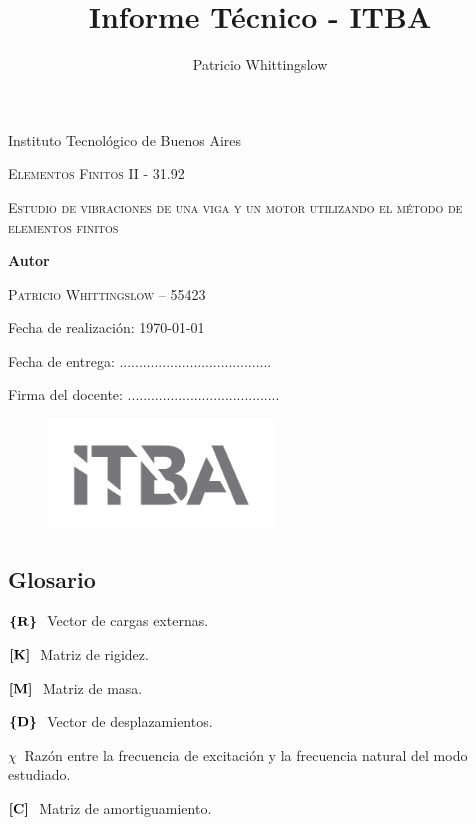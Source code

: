 \documentclass[onecolumn,10pt,titlepage,a4paper]{article}
\title{Informe Técnico - ITBA}
\author{Patricio Whittingslow}
\newcommand{\glossentry}[2]{$#1\ $ \indent #2 \par \vspace{.4cm} }
\begin{document}
\begin{titlepage}
	\centering
	
	{ \large Instituto Tecnológico de Buenos Aires  \par }
	\vspace{2cm}
	{\Large \scshape Elementos Finitos II - 31.92 \par}
	\vspace{2cm}
	{\Huge \scshape Estudio de vibraciones de una viga y un motor utilizando el método de elementos finitos\par }
	\vspace{.5cm}
	{\Large  \par}
	\vspace{2cm}
	{\large \bf Autor \par}
	\vspace{.5cm}
	\textsc{\large Patricio Whittingslow -- 55423}
	\vspace{2cm}
	{\par \large Fecha de realización: \today \par}
	\vspace{1cm}
	{\large Fecha de entrega: .......................................\par}
	\vspace{\fill}
	{\large Firma del docente: .......................................}
	\vspace{\fill}
	\begin{figure}[htb!]
		\centering
		\includegraphics[width=6cm]{fig/logoitba.png}
	\end{figure}
\end{titlepage}




\begin{multicols}{2}
	\section*{Glosario}
	\glossentry{\Cme{R}}{Vector de cargas externas.}
	\glossentry{\Mme{K}}{Matriz de rigidez.}
	\glossentry{\Mme{M}}{Matriz de masa.}
	\glossentry{\Cme{D}}{Vector de desplazamientos.}
	\glossentry{\chi}{Razón entre la frecuencia de excitación y la frecuencia natural del modo estudiado.}
	\glossentry{\Mme{C}}{Matriz de amortiguamiento.}
\end{multicols}
\end{document}
